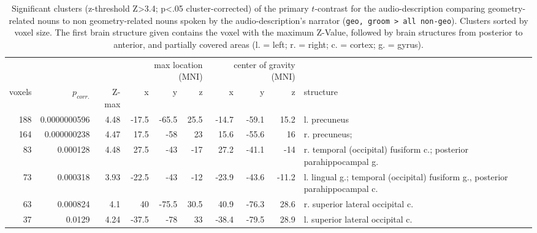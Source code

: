 \documentclass[english]{article}
\begin{document}
\begin{table}[h!]
    \caption{Significant clusters (z-threshold Z>3.4; p<.05 cluster-corrected)
        of the primary $t$-contrast for the audio-description comparing
        geometry-related nouns to non geometry-related nouns spoken by the
        audio-description's narrator (\texttt{geo, groom > all non-geo}).
        Clusters sorted by voxel size.
    The first brain structure given contains the voxel with the maximum Z-Value,
followed by brain structures from posterior to anterior, and partially covered
areas (l. = left; r. = right; c. = cortex; g. = gyrus).}
    \label{tab:res-ao-group1}
\begin{tabular}{rrrrrrrrrp{3cm}}
\toprule
& & & \multicolumn{3}{r}{max location (MNI)} & \multicolumn{3}{r}{center of gravity (MNI)} &
\\ \cmidrule{4-6} \cmidrule{7-9}
voxels & $p_{corr.}$ & Z-max & x & y & z  & x & y & z & structure \\
\midrule
188 & 0.0000000596 & 4.48 & -17.5 & -65.5 & 25.5 & -14.7 & -59.1 & 15.2 & l. precuneus \\
164 & 0.000000238 & 4.47 & 17.5 & -58 & 23 & 15.6 & -55.6 & 16 & r. precuneus; \\
83 & 0.000128 & 4.48 & 27.5 & -43 & -17 & 27.2 & -41.1 & -14 & r. temporal (occipital) fusiform c.; posterior parahippocampal g. \\
73 & 0.000318 & 3.93 & -22.5 & -43 & -12 & -23.9 & -43.6 & -11.2 & l. lingual g.; temporal (occipital) fusiform g., posterior parahippocampal c. \\
63 & 0.000824 & 4.1 & 40 & -75.5 & 30.5 & 40.9 & -76.3 & 28.6 & r. superior lateral occipital c. \\
37 & 0.0129 & 4.24 & -37.5 & -78 & 33 & -38.4 & -79.5 & 28.9 & l. superior lateral occipital c. \\
\bottomrule
\end{tabular}
\end{table}


\end{document}
